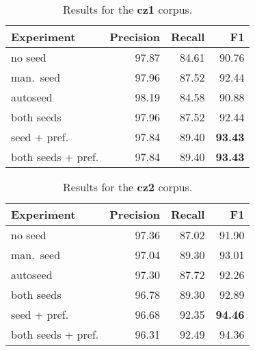 \documentclass{itatnew}
\begin{document}
\begin{table}[h]
\begin{center}
\begin{tabular}{|l|r|r|r|}
\hline \bf Experiment & \bf Precision & \bf Recall & \bf F1\\ \hline
no seed &  97.87 & 84.61 & 90.76 \\
man.~seed & 97.96 &  87.52 & 92.44 \\
autoseed & 98.19 & 84.58 & 90.88\\
both seeds & 97.96 & 87.52 & 92.44\\
seed + pref. & 97.84 & 89.40 & \bf 93.43\\
both seeds + pref.& 97.84 & 89.40 & \bf 93.43 \\
\hline
\end{tabular}
\end{center}
\caption{\label{table:res-cz1} Results for the \textbf{cz1} corpus.}
\end{table}

\begin{table}[h]
\begin{center}
\begin{tabular}{|l|r|r|r|}
\hline \bf Experiment & \bf Precision & \bf Recall & \bf F1\\ \hline
no seed & 97.36 & 87.02 & 91.90\\
man.~seed & 97.04 & 89.30 & 93.01 \\
autoseed & 97.30 & 87.72 & 92.26\\
both seeds & 96.78 & 89.30  & 92.89\\
seed + pref. & 96.68 & 92.35 & \bf 94.46\\
both seeds + pref. & 96.31 & 92.49 & 94.36\\
\hline
\end{tabular}
\end{center}
\caption{\label{table:res-cz2} Results for the \textbf{cz2} corpus.}
\end{table}
\end{document}
